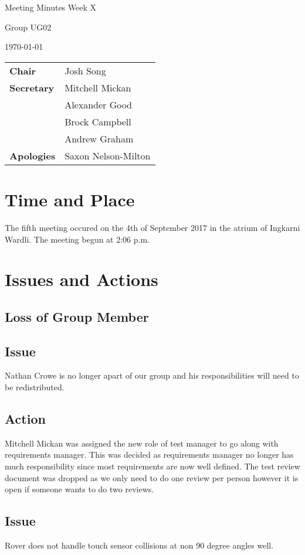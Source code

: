 \documentclass[11pt, a4paper]{article}
\begin{document}
\begin{center}    
{\huge Meeting Minutes Week X \par}
\vspace{0.5cm}
{\large Group UG02 \par}
\vspace{0.5cm}
{\large \today \par}
\vspace{0.5cm}
\end{center}

\begin{flushleft}
\begin{tabular}{ll}
{\bfseries Chair} & Josh Song \\
{\bfseries Secretary} & Mitchell Mickan \\
 & Alexander Good \\
 & Brock Campbell \\
 & Andrew Graham \\

{\bfseries Apologies} & Saxon Nelson-Milton \\
\end{tabular}
\end{flushleft}

\section{Time and Place}
	The fifth meeting occured on the 4th of September 2017 in the atrium of Ingkarni Wardli. The meeting begun at 2:06 p.m.
	
\section{Issues and Actions}
	\subsection{Loss of Group Member}
	\subsection*{Issue}
	Nathan Crowe is no longer apart of our group and his responsibilities will need to be redistributed.
	\subsection*{Action}
	Mitchell Mickan was assigned the new role of test manager to go along with requirements manager. This was decided as requirements manager no longer has much responsibility since most requirements are now well defined. The test review document was dropped as we only need to do one review per person however it is open if someone wants to do two reviews.
	\\\subsection*{Issue} Rover does not handle touch sensor collisions at non 90 degree angles well.
\end{document}
